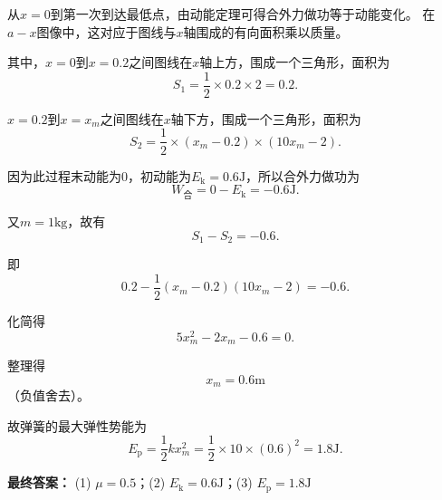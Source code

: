 \documentclass[CJKmath,a4paper,10pt]{ctexart}
\begin{document}
\begin{liti}
\begin{enumerate}
从$x=0$到第一次到达最低点，由动能定理可得合外力做功等于动能变化。
在$a-x$图像中，这对应于图线与$x$轴围成的有向面积乘以质量。

其中，$x=0$到$x=0.2$之间图线在$x$轴上方，围成一个三角形，面积为
\[
S_1=\frac12\times 0.2\times 2=0.2.
\]

$x=0.2$到$x=x_m$之间图线在$x$轴下方，围成一个三角形，面积为
\[
S_2=\frac12\times (x_m-0.2)\times (10x_m-2).
\]

因为此过程末动能为$0$，初动能为$E_\text{k}=0.6\mathrm{J}$，所以合外力做功为
\[
W_\text{合}=0-E_\text{k}=-0.6\mathrm{J}.
\]

又$m=1\mathrm{kg}$，故有
\[
S_1-S_2=-0.6.
\]

即
\[
0.2-\frac12(x_m-0.2)(10x_m-2)=-0.6.
\]

化简得
\[
5x_m^2-2x_m-0.6=0.
\]

整理得
\[
x_m=0.6\mathrm{m}
\]
（负值舍去）。

故弹簧的最大弹性势能为
\[
E_\text{p}=\frac12 kx_m^2=\frac12\times10\times(0.6)^2=1.8\mathrm{J}.
\]
\end{enumerate}
\noindent
\textbf{最终答案：}
(1) $\boxed{\mu=0.5}$；(2) $\boxed{E_\text{k}=0.6\mathrm{J}}$；(3) $\boxed{E_\text{p}=1.8\mathrm{J}}$

\end{liti}
\end{document}
